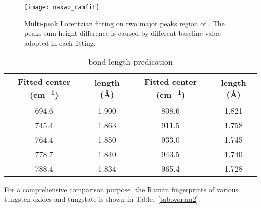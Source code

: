 \begin{figure}[htb]
\centering
\texttt{[image: naxwo\_ramfit]}
\caption[Multi-peak Lorentzian fitting on ]{Multi-peak Lorentzian fitting on two major peaks region of . The peaks sum height difference is caused by different baseline value adopted in each fitting.}
\label{fig:naworamfit}
\end{figure}

\begin{table}[htb]
\centering
\caption{ bond length predication}\label{tab:nawobond}
\begin{tabular}{cccc}
\toprule
Fitted center (\si{cm^{-1}}) & length (\AA) & Fitted center (\si{cm^{-1}}) & length (\AA) \\
\midrule
694.6 & 1.900 &  808.6 &  1.821 \\
745.4 & 1.863 &  911.5 &  1.758 \\
764.4 & 1.850 &  933.0 &  1.745 \\
778.7 & 1.840 &   943.5 & 1.740 \\
788.4 & 1.834 &   965.4 & 1.728 \\
\bottomrule
\end{tabular}
\end{table}
For a comprehensive comparison purpose, the Raman fingerprints of various tungsten oxides and tungstate is shown in Table.~\ref{tab:woram2}. 
